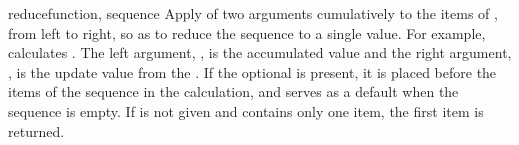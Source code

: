 \begin{funcdesc}{reduce}{function, sequence}
  Apply  of two arguments cumulatively to the items of
  , from left to right, so as to reduce the sequence to
  a single value.  For example,  calculates .  The left argument,
  , is the accumulated value and the right argument, ,
  is the update value from the .  If the optional
   is present, it is placed before the items of the
  sequence in the calculation, and serves as a default when the
  sequence is empty.  If  is not given and
   contains only one item, the first item is returned.
\end{funcdesc}

